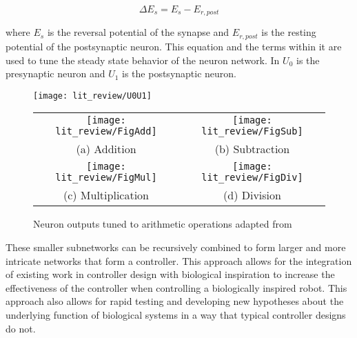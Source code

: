 \begin{equation}
\Delta E_{s} = E_{s} - E_{r, post}
\end{equation}

where $E_{s}$ is the reversal potential of the synapse and $E_{r, post}$ is the resting potential of the postsynaptic neuron.
This equation and the terms within it are used to tune the steady state behavior of the neuron network. In 
$U_{0}$ is the presynaptic neuron and $U_{1}$ is the postsynaptic neuron.

\begin{figure}
\centering

\texttt{[image: lit\_review/U0U1]}

\begin{tabular}{cc}
\texttt{[image: lit\_review/FigAdd]} &
\texttt{[image: lit\_review/FigSub]} \\
(a) Addition & (b) Subtraction \\
\texttt{[image: lit\_review/FigMul]} &
\texttt{[image: lit\_review/FigDiv]} \\
(c) Multiplication & (d) Division \\
\end{tabular}
\caption{Neuron outputs tuned to arithmetic operations adapted from \cite{NickFunctionalSubnetwork}}
\label{fig:MathOutputs}
\end{figure}

These smaller subnetworks can be recursively combined to form larger and more intricate
networks that form a controller. This approach allows for the integration of
existing work in controller design with biological inspiration to increase the
effectiveness of the controller when controlling a biologically inspired robot.
This approach also allows for rapid testing and developing new hypotheses about the underlying function of biological systems in a way that typical controller designs do not.
